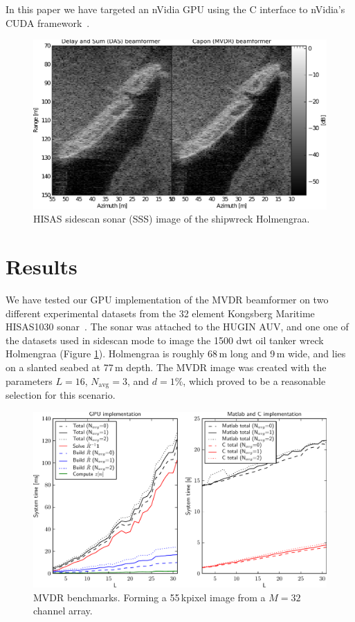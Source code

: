 \documentclass[10pt,a4paper]{article}
\newcommand\Fig[1]{Figure \ref{#1}}
\newcommand\1{\vec 1}
\begin{document}
In this paper we have targeted an nVidia \gls{GPU} using the C interface to nVidia's \gls{CUDA} framework~\cite{NvidiaCuda}.

\begin{figure}[!t]
\centering
\includegraphics[width=\linewidth]{gfx/img_holmengraa.pdf}
\caption{HISAS sidescan sonar (SSS) image of the shipwreck Holmengraa.}\label{holmengraa}
\end{figure}


\newpage
\section{Results}

We have tested our \gls{GPU} implementation of the \gls{MVDR} beamformer on two different experimental datasets from the 32 element Kongsberg Maritime HISAS1030 sonar~\cite{Hansen2009}. The sonar was attached to the HUGIN \gls{AUV}, and one one of the datasets used in sidescan mode to image the 1500 dwt oil tanker wreck Holmengraa (\Fig{holmengraa}). Holmengraa is roughly 68\,m long and 9\,m wide, and lies on a slanted seabed at 77\,m depth. The \gls{MVDR} image was created with the parameters $L=16$, $N_\text{avg}=3$, and $d=1\%$, which proved to be a reasonable selection for this scenario.

\begin{figure}[!t]
\centering
\includegraphics[width=\linewidth]{gfx/benchmark.pdf}
\caption{\gls{MVDR} benchmarks. Forming a 55\,kpixel image from a $M=32$ channel array.}\label{benchmarks}
\end{figure}
\end{document}
